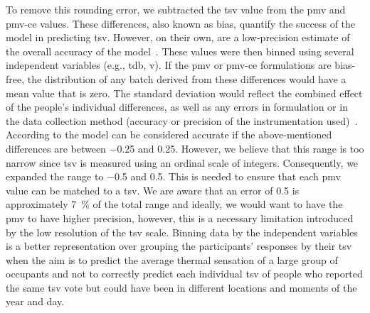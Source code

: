To remove this rounding error, we subtracted the \ac{tsv} value from the \ac{pmv} and \ac{pmv-ce} values.
These differences, also known as bias, quantify the success of the model in predicting \ac{tsv}.
However, on their own, are a low-precision estimate of the overall accuracy of the model~\cite{Humphreys2002}.
These values were then binned using several independent variables (e.g., \ac{tdb}, \ac{v}).
If the \ac{pmv} or \ac{pmv-ce} formulations are bias-free, the distribution of any batch derived from these differences would have a mean value that is zero.
The standard deviation would reflect the combined effect of the people's individual differences, as well as any errors in formulation or in the data collection method (accuracy or precision of the instrumentation used)~\cite{Humphreys2002}.
According to  the model can be considered accurate if the above-mentioned differences are between \num{-0.25} and \num{0.25}.
However, we believe that this range is too narrow since \ac{tsv} is measured using an ordinal scale of integers.
Consequently, we expanded the range to \num{-.5} and \num{0.5}.
This is needed to ensure that each \ac{pmv} value can be matched to a \ac{tsv}.
We are aware that an error of \num{.5} is approximately \qty{7}{\percent} of the total range and ideally, we would want to have the \ac{pmv} to have higher precision, however, this is a necessary limitation introduced by the low resolution of the \ac{tsv} scale.
Binning data by the independent variables is a better representation over grouping the participants' responses by their \ac{tsv} when the aim is to predict the average thermal sensation of a large group of occupants and not to correctly predict each individual \ac{tsv} of people who reported the same \ac{tsv} vote but could have been in different locations and moments of the year and day.

